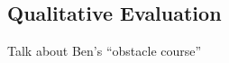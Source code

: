 \documentclass{article}
\begin{document}
\subsection{Qualitative Evaluation}

Talk about Ben's ``obstacle course''



%
%
%
%
%
\end{document}
